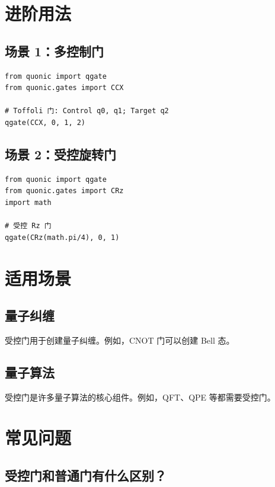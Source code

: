 \documentclass[12pt,a4paper]{article}
\begin{document}
\section{进阶用法}

\subsection{场景 1：多控制门}

\begin{verbatim}
from quonic import qgate
from quonic.gates import CCX

# Toffoli 门: Control q0, q1; Target q2
qgate(CCX, 0, 1, 2)
\end{verbatim}

\subsection{场景 2：受控旋转门}

\begin{verbatim}
from quonic import qgate
from quonic.gates import CRz
import math

# 受控 Rz 门
qgate(CRz(math.pi/4), 0, 1)
\end{verbatim}

\section{适用场景}

\subsection{量子纠缠}

受控门用于创建量子纠缠。例如，CNOT 门可以创建 Bell 态。

\subsection{量子算法}

受控门是许多量子算法的核心组件。例如，QFT、QPE 等都需要受控门。

\section{常见问题}

\subsection{受控门和普通门有什么区别？}
\end{document}
